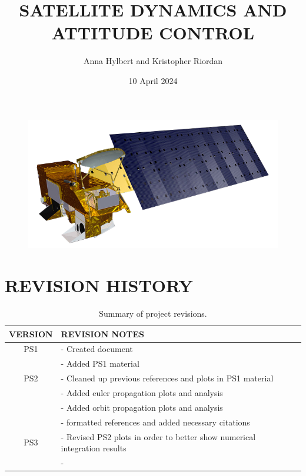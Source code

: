\documentclass[12pt,a4paper,notitlepage]{article}
\begin{document}
\title{\Huge \textbf{SATELLITE DYNAMICS AND ATTITUDE CONTROL}}
\author{Anna Hylbert and Kristopher Riordan}
\date{10 April 2024}

\begin{minipage}[h]{\textwidth}
	\vspace{4 cm}
	\advance\leftskip-1in
    \maketitle
\end{minipage}

\begin{figure}[H]
\centering
\includegraphics[width = 15cm]{Images/Aqua_spacecraft_model.png}
\end{figure}

\pagebreak

\section*{\Large REVISION HISTORY}

\begin{table}[h!]
\begin{center}
\begin{tabular} [0.9 \textwidth]{cl}
\hline \hline
\multicolumn{1}{c}{VERSION} & \multicolumn{1}{l}{REVISION NOTES} \\
\hline
PS1 & - Created document \\
    & - Added PS1 material \\
\hline
PS2 & - Cleaned up previous references and plots in PS1 material \\
    & - Added euler propagation plots and analysis \\
    & - Added orbit propagation plots and analysis \\
    & - formatted references and added necessary citations \\
\hline
PS3 & - Revised PS2 plots in order to better show numerical integration results\\
    & - \\
\hline \hline
\end{tabular}
	\caption{Summary of project revisions.}
\end{center}
\end{table}
 
\end{document}

